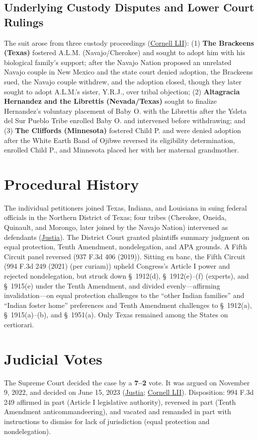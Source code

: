 \documentclass[12pt]{article}
\begin{document}
\subsection{Underlying Custody Disputes and Lower Court Rulings}
The suit arose from three custody proceedings (\href{https://www.law.cornell.edu/supremecourt/text/21-376}{Cornell LII}): (1) \textbf{The Brackeens (Texas)} fostered A.L.M. (Navajo/Cherokee) and sought to adopt him with his biological family's support; after the Navajo Nation proposed an unrelated Navajo couple in New Mexico and the state court denied adoption, the Brackeens sued, the Navajo couple withdrew, and the adoption closed, though they later sought to adopt A.L.M.'s sister, Y.R.J., over tribal objection; (2) \textbf{Altagracia Hernandez and the Librettis (Nevada/Texas)} sought to finalize Hernandez's voluntary placement of Baby O. with the Librettis after the Ysleta del Sur Pueblo Tribe enrolled Baby O. and intervened before withdrawing; and (3) \textbf{The Cliffords (Minnesota)} fostered Child P. and were denied adoption after the White Earth Band of Ojibwe reversed its eligibility determination, enrolled Child P., and Minnesota placed her with her maternal grandmother.

\section{Procedural History}
The individual petitioners joined Texas, Indiana, and Louisiana in suing federal officials in the Northern District of Texas; four tribes (Cherokee, Oneida, Quinault, and Morongo, later joined by the Navajo Nation) intervened as defendants (\href{https://supreme.justia.com/cases/federal/us/599/21-376/}{Justia}). The District Court granted plaintiffs summary judgment on equal protection, Tenth Amendment, nondelegation, and APA grounds. A Fifth Circuit panel reversed (937 F.3d 406 (2019)). Sitting en banc, the Fifth Circuit (994 F.3d 249 (2021) (per curiam)) upheld Congress's Article I power and rejected nondelegation, but struck down \S~1912(d), \S~1912(e)--(f) (experts), and \S~1915(e) under the Tenth Amendment, and divided evenly---affirming invalidation---on equal protection challenges to the ``other Indian families'' and ``Indian foster home'' preferences and Tenth Amendment challenges to \S~1912(a), \S~1915(a)--(b), and \S~1951(a). Only Texas remained among the States on certiorari.

\section{Judicial Votes}
The Supreme Court decided the case by a \textbf{7--2} vote. It was argued on November 9, 2022, and decided on June 15, 2023 (\href{https://supreme.justia.com/cases/federal/us/599/21-376/}{Justia}; \href{https://www.law.cornell.edu/supremecourt/text/21-376}{Cornell LII}). Disposition: 994 F.3d 249 affirmed in part (Article I legislative authority), reversed in part (Tenth Amendment anticommandeering), and vacated and remanded in part with instructions to dismiss for lack of jurisdiction (equal protection and nondelegation).
\end{document}
